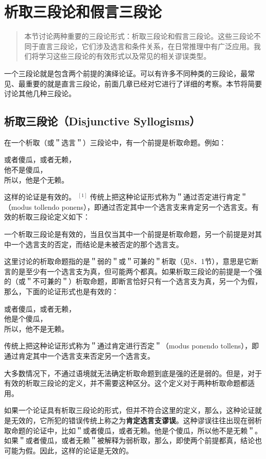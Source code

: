 \section{析取三段论和假言三段论}

\begin{quotation}
本节讨论两种重要的三段论形式：析取三段论和假言三段论。这些三段论不同于直言三段论，它们涉及选言和条件关系，在日常推理中有广泛应用。我们将学习这些三段论的有效形式以及常见的相关谬误类型。
\end{quotation}

一个三段论就是包含两个前提的演绎论证。可以有许多不同种类的三段论，最常见、最重要的就是直言三段论，前面几章已经对它进行了详细的考察。本节将简要讨论其他几种三段论。

\subsection{析取三段论（Disjunctive Syllogisms）}
在一个析取（或＂选言＂）三段论中，有一个前提是析取命题。例如：

或者傻瓜，或者无赖，\\
他不是傻瓜，\\
所以，他是个无赖。

这样的论证是有效的。 ${ }^{[1]}$ 传统上把这种论证形式称为＂通过否定进行肯定＂（modus tollendo ponens），即通过否定其中一个选言支来肯定另一个选言支。有效的析取三段论定义如下：

一个析取三段论是有效的，当且仅当其中一个前提是析取命题，另一个前提是对其中一个选言支的否定，而结论是未被否定的那个选言支。

这里讨论的析取命题指的是＂弱的＂或＂可兼的＂析取（见8．1节），意思是它断言的是至少有一个选言支为真，但可能两个都真。如果析取三段论的前提是一个强的（或＂不可兼的＂）析取命题，即断言恰好只有一个选言支为真，另一个为假，那么，下面的论证形式也是有效的：

或者傻瓜，或者无赖，\\
他是个傻瓜，\\
所以，他不是无赖。

传统上把这种论证形式称为＂通过肯定进行否定＂（modus ponendo tollens），即通过肯定其中一个选言支来否定另一个选言支。

大多数情况下，不通过语境就无法确定析取命题到底是强的还是弱的。但是，对于有效的析取三段论的定义，并不需要这种区分。这个定义对于两种析取命题都适用。

如果一个论证具有析取三段论的形式，但并不符合这里的定义，那么，这种论证就是无效的，它所犯的错误传统上称之为\textbf{肯定选言支谬误}。这种谬误往往出现在弱析取命题的论证中，比如＂或者傻瓜，或者无赖。他是个傻瓜，所以他不是无赖＂。如果＂或者傻瓜，或者无赖＂被解释为弱析取，那么，即使两个前提都真，结论也可能为假。因此，这样的论证是无效的。

